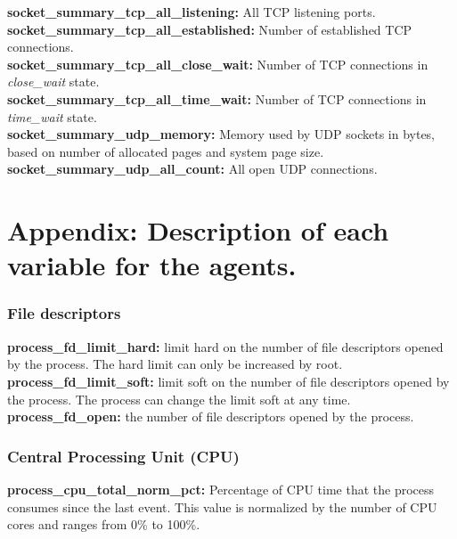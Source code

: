 \documentclass{iosart2c}
\begin{document}
\textbf{socket\_summary\_tcp\_all\_listening:} All TCP listening ports.\\

\textbf{socket\_summary\_tcp\_all\_established:} Number of established TCP connections.\\

\textbf{socket\_summary\_tcp\_all\_close\_wait:} Number of TCP connections in \textit{close\_wait} state.\\

\textbf{socket\_summary\_tcp\_all\_time\_wait:} Number of TCP connections in \textit{time\_wait} state.\\

\textbf{socket\_summary\_udp\_memory:} Memory used by UDP sockets in bytes, based on number of allocated pages and system page size.\\

\textbf{socket\_summary\_udp\_all\_count:} All open UDP connections.\\



\section{Appendix: Description of each variable for the agents.}


\subsubsection{File descriptors}

\textbf{process\_fd\_limit\_hard:} limit hard on the number of file descriptors opened by the process. The hard limit can only be increased by root.\\

\textbf{process\_fd\_limit\_soft:} limit soft on the number of file descriptors opened by the process. The process can change the limit soft at any time.\\

\textbf{process\_fd\_open:} the number of file descriptors opened by the process.\\


\subsubsection{Central Processing Unit (CPU)}

\textbf{process\_cpu\_total\_norm\_pct:} Percentage of CPU time that the process consumes since the last event. This value is normalized by the number of CPU cores and ranges from 0\% to 100\%.\\
\end{document}
